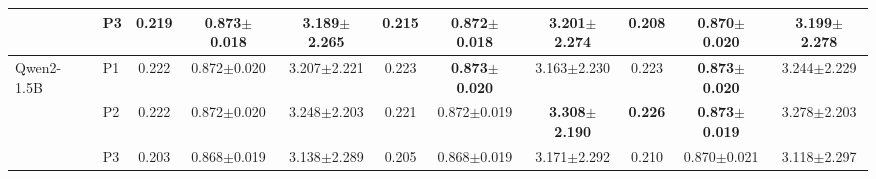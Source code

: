 \begin{table}[b]
{\begin{tabular}{llccccccccc}
\cmidrule(lr){2-11}
 & \multirow{1}{*}{P3} & 0.219 & 0.873{\scriptsize$\pm$0.018} & 3.189{\scriptsize$\pm$2.265} & 0.215 & 0.872{\scriptsize$\pm$0.018} & 3.201{\scriptsize$\pm$2.274} & 0.208 & 0.870{\scriptsize$\pm$0.020} & 3.199{\scriptsize$\pm$2.278} \\
\midrule
\multirow{3}{*}{Qwen2-1.5B} & \multirow{1}{*}{P1} & 0.222 & 0.872{\scriptsize$\pm$0.020} & 3.207{\scriptsize$\pm$2.221} & 0.223 & \textbf{0.873{\scriptsize$\pm$0.020}} & 3.163{\scriptsize$\pm$2.230} & 0.223 & \textbf{0.873{\scriptsize$\pm$0.020}} & 3.244{\scriptsize$\pm$2.229} \\
\cmidrule(lr){2-11}
 & \multirow{1}{*}{P2} & 0.222 & 0.872{\scriptsize$\pm$0.020} & 3.248{\scriptsize$\pm$2.203} & 0.221 & 0.872{\scriptsize$\pm$0.019} & \textbf{3.308{\scriptsize$\pm$2.190}} & \textbf{0.226} & \textbf{0.873{\scriptsize$\pm$0.019}} & 3.278{\scriptsize$\pm$2.203} \\
\cmidrule(lr){2-11}
 & \multirow{1}{*}{P3} & 0.203 & 0.868{\scriptsize$\pm$0.019} & 3.138{\scriptsize$\pm$2.289} & 0.205 & 0.868{\scriptsize$\pm$0.019} & 3.171{\scriptsize$\pm$2.292} & 0.210 & 0.870{\scriptsize$\pm$0.021} & 3.118{\scriptsize$\pm$2.297} \\
\bottomrule
\end{tabular}
}
\end{table}
